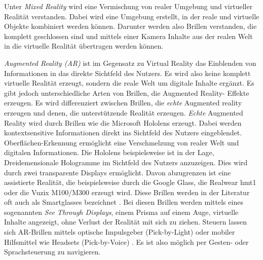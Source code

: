 Unter \emph{Mixed Reality} wird eine Vermischung von realer Umgebung und virtueller Realität verstanden. Dabei wird eine Umgebung erstellt, in der reale und virtuelle Objekte kombiniert werden können. Darunter werden also Brillen verstanden, die komplett geschlossen sind und mittels einer Kamera Inhalte aus der realen Welt in die virtuelle Realität übertragen werden können.

\emph{Augmented Reality (AR)} ist im Gegensatz zu Virtual Reality das Einblenden von Informationen in das direkte Sichtfeld des Nutzers. Es wird also keine komplett virtuelle Realität erzeugt, sondern die reale Welt um digitale Inhalte ergänzt. Es gibt jedoch unterschiedliche Arten von Brillen, die Augmented Reality- Effekte erzeugen. Es wird differenziert zwischen Brillen, die \emph{echte} Augmented reality erzeugen und denen, die unterstützende Realität erzeugen. \emph{Echte} Augmented Reality wird durch Brillen wie die Microsoft Hololens erzeugt. Dabei werden kontextsensitive Informationen direkt ins Sichtfeld des Nutzers eingeblendet. Oberflächen-Erkennung ermöglicht eine Verschmelzung von realer Welt und digitalen Informationen. Die Hololens beispielsweise ist in der Lage, Dreidemensionale Hologramme im Sichtfeld des Nutzers anzuzeigen. Dies wird durch zwei transparente Displays ermöglicht.
Davon abzugrenzen ist eine assistierte Realität, die beispielsweise durch die Google Glass, die Realwear hmt1 oder die Vuzix M100/M300 erzeugt wird. Diese Brillen werden in der Literatur oft auch als Smartglasses bezeichnet \cite[S.~26]{ThomasDirkMetzgerHelmutNiegemannHrsg2018}. Bei diesen Brillen werden mittels eines sogenannten \emph{See Through Displays}, einem Prisma auf einem Auge, virtuelle Inhalte angezeigt, ohne Verlust der Realität mit sich zu ziehen. Steuern lassen sich AR-Brillen mittels optische Impulsgeber (Pick-by-Light) oder mobiler Hilfsmittel wie Headsets (Pick-by-Voice) \cite{INTRALOGISTIK2016}. Es ist also möglich per Gesten- oder Sprachsteuerung zu navigieren.

%
%
